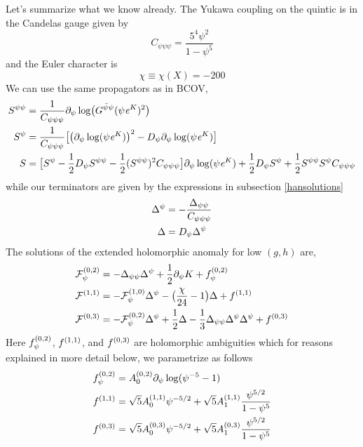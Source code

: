 Let's summarize what we know already. The Yukawa coupling on the quintic 
is in the Candelas gauge given by
\begin{equation}
C_{\psi\psi\psi} = \frac{5^4\psi^2}{1-\psi^5}
\end{equation}
and the Euler character is
\begin{equation}
\chi\equiv \chi(X)=-200
\end{equation}
We can use the same propagators as in BCOV, 
\begin{align}
\notag
S^{\psi\psi} &= \frac{1}{C_{\psi\psi\psi}} 
\del_\psi \log \bigl(G^{\bar\psi\psi} (\psi\ee^K)^2\bigr) \\
\eqlabel{exprop} 
S^{\psi} &= \frac{1}{C_{\psi\psi\psi}} \bigl[
\bigl(\del_\psi\log ( \psi \ee^K) \bigr)^2 - D_\psi\del_\psi\log (\psi \ee^K)\bigr] \\
\notag
S &=\bigl[S^\psi-\frac 12 D_\psi S^{\psi\psi} - 
\frac 12 (S^{\psi\psi})^2C_{\psi\psi\psi}\bigr]\del_\psi\log ( \psi \ee^K)
+ \frac 12 D_\psi S^\psi +\frac 12 S^{\psi\psi} S^{\psi} C_{\psi\psi\psi}
\end{align}
while our terminators are given by the expressions in subsection 
\ref{hansolutions}
\begin{equation}
\eqlabel{exterm}
\begin{split}
\Delta^\psi &= -\frac{\Delta_{\psi\psi}}{C_{\psi\psi\psi}} \\
\Delta & = D_\psi\Delta^\psi
\end{split}
\end{equation}
The solutions of the extended holomorphic anomaly for low $(g,h)$ are,
\begin{equation}
\eqlabel{expsols}
\begin{split}
\F 02_\psi & = -\Delta_{\psi\psi} \Delta^\psi + \frac 12 \del_\psi K + \f 02_\psi \\
\F 11 & = -\F 10_\psi\Delta^\psi -\bigl(\frac{\chi}{24}-1\bigr) \Delta + \f 11 \\
\F 03 & = -\F 02_\psi\Delta^\psi +\frac 12 \Delta - 
\frac 13\Delta_{\psi\psi}\Delta^\psi\Delta^\psi + \f 03\\
\end{split}
\end{equation}
Here $f^{(0,2)}_\psi$, $f^{(1,1)}$, and $f^{(0,3)}$ are holomorphic ambiguities which for 
reasons explained in more detail below, we parametrize as follows
\begin{equation}
\eqlabel{expambi}
\begin{split}
\f 02_\psi &= \A 020 \del_\psi \log(\psi^{-5}-1) \\
\f 11 &=  \sqrt 5\A 110 \psi^{-5/2} + \sqrt 5\A 111 \frac{\psi^{5/2}}{1-\psi^5}\\
\f 03 &= \sqrt 5\A 030 \psi^{-5/2} + \sqrt 5\A 031 \frac{\psi^{5/2}}{1-\psi^5}
\end{split}
\end{equation}

